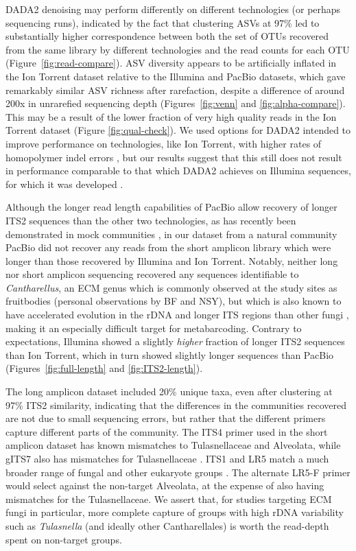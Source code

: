\documentclass[
  12pt,
]{article}
\begin{document}
DADA2 denoising may perform differently on different technologies (or perhaps sequencing runs), indicated by the fact that clustering ASVs at 97\% led to substantially higher correspondence between both the set of OTUs recovered from the same library by different technologies and the read counts for each OTU (Figure~\ref{fig:read-compare}).
ASV diversity appears to be artificially inflated in the Ion Torrent dataset relative to the Illumina and PacBio datasets, which gave remarkably similar ASV richness after rarefaction, despite a difference of around 200x in unrarefied sequencing depth (Figures~\ref{fig:venn} and \ref{fig:alpha-compare}).
This may be a result of the lower fraction of very high quality reads in the Ion Torrent dataset (Figure \ref{fig:qual-check}).
We used options for DADA2 intended to improve performance on technologies, like Ion Torrent, with higher rates of homopolymer indel errors \autocite{callahan2020b}, but our results suggest that this still does not result in performance comparable to that which DADA2 achieves on Illumina sequences, for which it was developed \autocite{callahan2016}.

Although the longer read length capabilities of PacBio allow recovery of longer ITS2 sequences than the other two technologies, as has recently been demonstrated in mock communities \autocite{castano2020}, in our dataset from a natural community PacBio did not recover any reads from the short amplicon library which were longer than those recovered by Illumina and Ion Torrent.
Notably, neither long nor short amplicon sequencing recovered any sequences identifiable to \emph{Cantharellus}, an ECM genus which is commonly observed at the study sites as fruitbodies (personal observations by BF and NSY), but which is also known to have accelerated evolution in the rDNA \autocite{moncalvo2006} and longer ITS regions than other fungi \autocite{Feibelman_1994}, making it an especially difficult target for metabarcoding.
Contrary to expectations, Illumina showed a slightly \emph{higher} fraction of longer ITS2 sequences than Ion Torrent, which in turn showed slightly longer sequences than PacBio (Figures~\ref{fig:full-length} and \ref{fig:ITS2-length}).

The long amplicon dataset included 20\% unique taxa, even after clustering at 97\% ITS2 similarity, indicating that the differences in the communities recovered are not due to small sequencing errors, but rather that the different primers capture different parts of the community.
The ITS4 primer used in the short amplicon dataset has known mismatches to Tulasnellaceae and Alveolata, while gITS7 also has mismatches for Tulasnellaceae \autocite{tedersoo2015}.
ITS1 and LR5 match a much broader range of fungal and other eukaryote groups \autocite{tedersoo2015}. The alternate LR5-F primer \autocite{tedersoo2008} would select against the non-target Alveolata, at the expense of also having mismatches for the Tulasnellaceae.
We assert that, for studies targeting ECM fungi in particular, more complete capture of groups with high rDNA variability such as \emph{Tulasnella} (and ideally other Cantharellales) is worth the read-depth spent on non-target groups.
\end{document}
